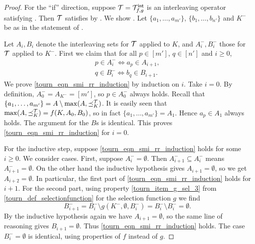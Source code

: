 \begin{proof}
    For the ``if'' direction, suppose $\mathcal{T} = {\mathcal{T}_{f, g}^\mathsf{int}}$ is an interleaving
    operator satisfying \smi{}. Then $\mathcal{T}$ satisfies
    \chaindef{} by . We
    show \rankremoval{}. Let $\{a_1, \ldots, a_{m'}\}$, $\{b_1,
    \ldots, b_{n'}\}$ and $K^-$ be as in the statement of
    \rankremoval{}.

    Let $A_i, B_i$ denote the interleaving sets for $\mathcal{T}$ applied to $K$, and
    $A^-_i, B^-_i$ those for $\mathcal{T}$ applied to $K^-$. First we claim that for
    all $p \in [m']$, $q \in [n']$ and $i \ge 0$,
    \begin{equation}
        \label{tourn_eqn_smi_rr_induction}
        \begin{split}
            p \in A^-_i \iff a_p \in A_{i + 1}, \\
            q \in B^-_i \iff b_q \in B_{i + 1}.
        \end{split}
    \end{equation}
    We prove \cref{tourn_eqn_smi_rr_induction} by induction on $i$. Take
    $i = 0$. By definition, $A^-_0 = A_{K^-} = [m']$, so $p \in A^-_0$ always
    holds. Recall that $\{a_1, \ldots, a_{m'}\} = A \setminus \max(A,
    {\preceq_K^{\mathcal{T}}})$. It is easily seen that $\max(A, {\preceq_K^{\mathcal{T}}}) = f(K, A_0,
    B_0)$, so in fact $\{a_1, \ldots, a_{m'}\} = A_1$. Hence $a_p \in A_1$
    always holds. The argument for the $B$s is identical. This proves
    \cref{tourn_eqn_smi_rr_induction} for $i = 0$.

    For the inductive step, suppose \cref{tourn_eqn_smi_rr_induction}
    holds for some $i \ge 0$. We consider cases. First, suppose $A^-_i =
    \emptyset$. Then $A^-_{i + 1} \subseteq A^-_i$ means $A^-_{i + 1} =
    \emptyset$. On the other hand the inductive hypothesis gives $A_{i + 1} =
    \emptyset$, so we get $A_{i + 2} = \emptyset$. In particular, the first
    part of \cref{tourn_eqn_smi_rr_induction} holds for $i + 1$. For the
    second part, using property \cref{tourn_item_g_sel_3} from
    \cref{tourn_def_selectionfunction} for the selection function $g$ we find
    \[
        B^-_{i + 1}
        = B^-_i \setminus g(K^-, \emptyset, B^-_i)
        = B^-_i \setminus B^-_i
        = \emptyset.
    \]
    By the inductive hypothesis again we have $A_{i + 1} = \emptyset$, so the
    same line of reasoning gives $B_{i + 1} = \emptyset$. Thus
    \cref{tourn_eqn_smi_rr_induction} holds. The case $B^-_i = \emptyset$
    is identical, using properties of $f$ instead of $g$.


\end{proof}

